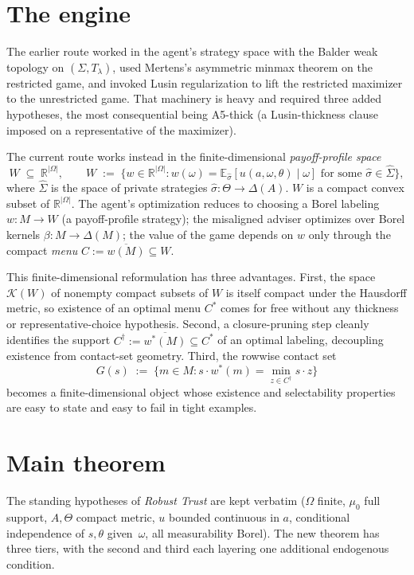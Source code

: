 \documentclass[11pt]{article}
\theoremstyle{definition}
\theoremstyle{remark}
\newcommand{\R}{\mathbb{R}}
\newcommand{\Om}{\Omega}
\newcommand{\Th}{\Theta}
\newcommand{\Si}{\Sigma}
\newcommand{\E}{\mathbb{E}}
\begin{document}
\section{The engine}\label{sec:engine}

The earlier route worked in the agent's strategy space with the
Balder weak topology on $(\Si,T_\lambda)$, used Mertens's asymmetric
minmax theorem on the restricted game, and invoked Lusin
regularization to lift the restricted maximizer to the unrestricted
game. That machinery is heavy and required three added hypotheses,
the most consequential being A5-thick (a Lusin-thickness clause
imposed on a representative of the maximizer).

The current route works instead in the finite-dimensional
\emph{payoff-profile space}
\[
  W \;\subseteq\; \R^{|\Om|},
  \qquad
  W \;:=\; \big\{w\in\R^{|\Om|} : w(\omega) = \E_{\hat\sigma}[u(a,\omega,\theta)\mid\omega]\text{ for some }\hat\sigma\in\hat\Si\big\},
\]
where $\hat\Si$ is the space of private strategies $\hat\sigma:\Th\to\Delta(A)$.
$W$ is a compact convex subset of $\R^{|\Om|}$. The agent's optimization
reduces to choosing a Borel labeling $w:M\to W$ (a payoff-profile
strategy); the misaligned adviser optimizes over Borel kernels
$\beta:M\to\Delta(M)$; the value of the game depends on $w$ only
through the compact \emph{menu} $C := \overline{w(M)}\subseteq W$.

This finite-dimensional reformulation has three advantages. First,
the space $\mathcal K(W)$ of nonempty compact subsets of $W$ is
itself compact under the Hausdorff metric, so existence of an
optimal menu $C^*$ comes for free without any thickness or
representative-choice hypothesis. Second, a closure-pruning step
cleanly identifies the support $C^\dagger := \overline{w^*(M)}\subseteq C^*$
of an optimal labeling, decoupling existence from contact-set
geometry. Third, the rowwise contact set
\[
  G(s) \;:=\; \{m\in M : s\cdot w^*(m) = \min_{z\in C^\dagger} s\cdot z\}
\]
becomes a finite-dimensional object whose existence and selectability
properties are easy to state and easy to fail in tight examples.

\section{Main theorem}\label{sec:main}

The standing hypotheses of \emph{Robust Trust} are kept verbatim
($\Om$ finite, $\mu_0$ full support, $A,\Th$ compact metric, $u$
bounded continuous in $a$, conditional independence of $s,\theta$
given~$\omega$, all measurability Borel). The new theorem has three
tiers, with the second and third each layering one additional
endogenous condition.
\end{document}
